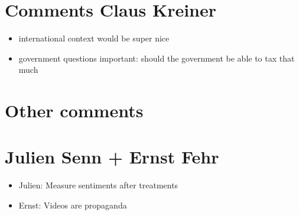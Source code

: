 \documentclass{article}
\begin{document}
\section{Comments Claus Kreiner}
\begin{itemize}
    \item international context would be super nice
    \item government questions important: should the government be able to tax that much
    
\end{itemize}

\section{Other comments}

\section{Julien Senn + Ernst Fehr}
\begin{itemize}
    \item Julien: Measure sentiments after treatments
    \item Ernst: Videos are propaganda
\end{itemize}
\end{document}
